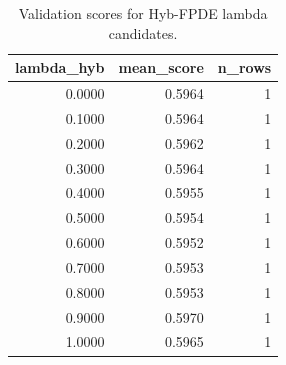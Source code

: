 \begin{table}[t]
\caption{Validation scores for Hyb-FPDE lambda candidates.}
\label{tab:lambda_distribution_computed}
\centering
\begin{tabular}{rrr}
\toprule
lambda\_hyb & mean\_score & n\_rows \\
\midrule
0.0000 & 0.5964 & 1 \\
0.1000 & 0.5964 & 1 \\
0.2000 & 0.5962 & 1 \\
0.3000 & 0.5964 & 1 \\
0.4000 & 0.5955 & 1 \\
0.5000 & 0.5954 & 1 \\
0.6000 & 0.5952 & 1 \\
0.7000 & 0.5953 & 1 \\
0.8000 & 0.5953 & 1 \\
0.9000 & 0.5970 & 1 \\
1.0000 & 0.5965 & 1 \\
\bottomrule
\end{tabular}

\end{table}
